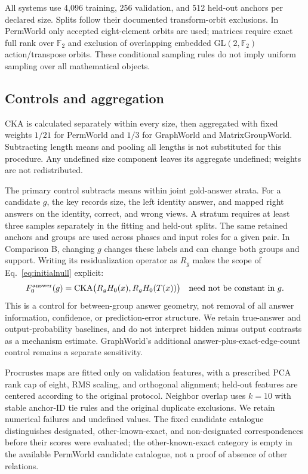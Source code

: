 \documentclass[10pt]{article}
\newcommand{\cka}{\operatorname{CKA}}
\newcommand{\Ftwo}{\mathbb F_2}
\begin{document}
All systems use 4,096 training, 256 validation, and 512 held-out anchors per
declared size. Splits follow their documented transform-orbit exclusions.
In PermWorld only accepted eight-element orbits are used; matrices require
exact full rank over $\Ftwo$ and exclusion of overlapping embedded
$\mathrm{GL}(2,\Ftwo)$ action/transpose orbits. These conditional sampling
rules do not imply uniform sampling over all mathematical objects.



\subsection{Controls and aggregation}
\label{sec:controls}
CKA is calculated separately within every size, then aggregated with fixed
weights $1/21$ for PermWorld and $1/3$ for GraphWorld and MatrixGroupWorld.
Subtracting length means and pooling all lengths is not substituted for
this procedure. Any undefined size component leaves its aggregate
undefined; weights are not redistributed.

The primary control subtracts means within joint gold-answer strata. For a
candidate $g$, the key records size, the left identity answer, and mapped
right answers on the identity, correct, and wrong views. A stratum requires
at least three samples separately in the fitting and held-out splits.
The same retained anchors and groups are used across phases and input
roles for a given pair. In Comparison B, changing $g$ changes these labels
and can change both groups and support. Writing its residualization
operator as $R_g$ makes the scope of Eq.~\ref{eq:initialnull} explicit:
\begin{equation}
 F_0^{\rm answer}(g)=
 \cka\bigl(R_gH_0(x),R_gH_0(T(x))\bigr)
 \quad\text{need not be constant in }g.
 \label{eq:residualinit}
\end{equation}
This is a control for between-group answer geometry, not removal of all
answer information, confidence, or prediction-error structure. We retain
true-answer and output-probability baselines, and do not interpret hidden
minus output contrasts as a mechanism estimate. GraphWorld's additional
answer-plus-exact-edge-count control remains a separate sensitivity.

Procrustes maps are fitted only on validation features, with a prescribed
PCA rank cap of eight, RMS scaling, and orthogonal alignment; held-out
features are centered according to the original protocol. Neighbor overlap
uses $k=10$ with stable anchor-ID tie rules and the original duplicate
exclusions. We retain numerical failures and undefined values. The fixed
candidate catalogue distinguishes designated, other-known-exact, and
non-designated correspondences before their scores were evaluated; the
other-known-exact category is empty in the available PermWorld candidate
catalogue, not a proof of absence of other relations.
\end{document}

